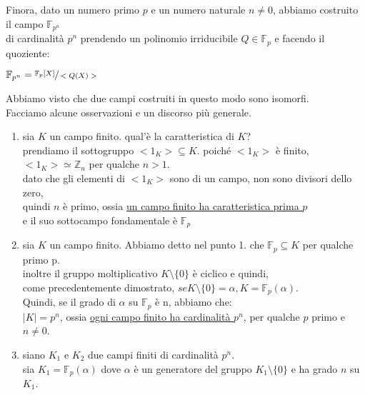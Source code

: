 \documentclass[a4paper,12pt]{article}
\theoremstyle{def}
\theoremstyle{prop}
\theoremstyle{esempio}
\theoremstyle{dimostrazione}
\theoremstyle{teo}
\theoremstyle{osservazione}
\begin{document}
\vspace{\baselineskip}

Finora, dato un numero primo \(p\) e un numero naturale \(n \neq 0\), abbiamo costruito il campo \(\mathbb{F}_{p^n}\)\\
di cardinalità \(p^n\) prendendo un polinomio irriducibile \(Q \in \mathbb{F}_p\) e facendo il quoziente:
\begin{center}
    \(\mathbb{F}_{p^n} = \sfrac{\mathbb{F}_p[X]}{<Q(X)>}\)
\end{center}
Abbiamo visto che due campi costruiti in questo modo sono isomorfi.\\
Facciamo alcune osservazioni e un discorso più generale.\\

\begin{enumerate}
    \item sia \(K\) un campo finito. qual'è la caratteristica di \(K\)?\\
        prendiamo il sottogruppo \(<1_K> \subseteq K\). poiché \(<1_K>\) è finito,\\
        \(<1_K> \simeq \mathbb{Z}_n\) per qualche \(n > 1\).\\
        dato che gli elementi di \(<1_K>\) sono di un campo, non sono divisori dello zero,\\
        quindi \(n\) è primo, ossia \underline{un campo finito ha caratteristica prima \(p\)}\\
        e il suo sottocampo fondamentale è \(\mathbb{F}_p\)\\
    \item sia \(K\) un campo finito. Abbiamo detto nel punto 1. che \(\mathbb{F}_p \subseteq K\) per qualche primo p.\\
        inoltre il gruppo moltiplicativo \(K \setminus \{0\}\) è ciclico e quindi,\\
        come precedentemente dimostrato, \(se K \setminus \{0\} = \alpha, K = \mathbb{F}_p(\alpha)\).\\
        Quindi, se il grado di \(\alpha\) su \(\mathbb{F}_p\) è n, abbiamo che:\\
        \(|K| = p^n\), ossia \underline{ogni campo finito ha cardinalità \(p^n\)}, per qualche \(p\) primo e \(n \neq 0\).\\
    \item siano \(K_1\) e \(K_2\) due campi finiti di cardinalità \(p^n\).\\
        sia \(K_1 = \mathbb{F}_p(\alpha)\) dove \(\alpha\) è un generatore del gruppo \(K_1 \setminus \{0\}\) e ha grado \(n\) su \(K_1\).\\

\end{enumerate}
\end{document}
